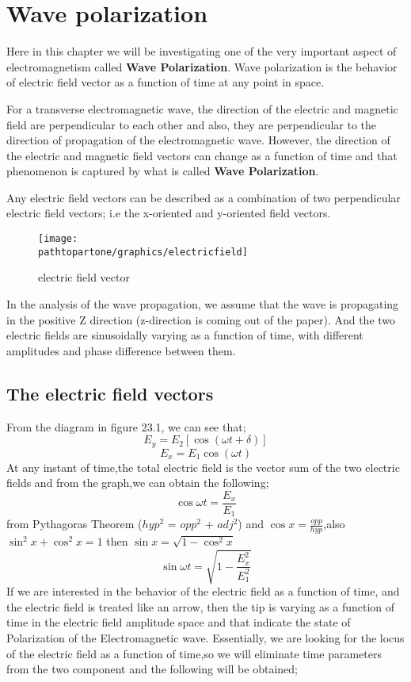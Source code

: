 \chapter{Wave polarization}\label{lec:lec23}
Here in this chapter we will be investigating one of the very important aspect of electromagnetism called \textbf{Wave Polarization}. Wave polarization is the behavior of electric field vector as a function of time at any point in space.

For a transverse electromagnetic wave, the direction of the electric and magnetic field are perpendicular to each other and also, they are perpendicular to the direction of propagation of the electromagnetic wave. However, the direction of the electric and magnetic field vectors can change as a function of time and that phenomenon is captured by what is called \textbf{Wave Polarization}.

Any electric field vectors can be described as a combination of two perpendicular electric field vectors; i.e the x-oriented and y-oriented field vectors. 
\begin{figure}[h]
\centering
\texttt{[image: \\pathtopartone/graphics/electricfield]}
\caption{electric field vector}
\end{figure}

In the analysis of the wave propagation, we assume that the wave is propagating in the positive Z direction (z-direction is coming out of the paper). And the two electric fields are sinusoidally varying as a function of time, with different amplitudes and phase difference between them.	

\section{The electric field vectors} 
From the diagram in figure 23.1, we can see that;
\begin{equation}
E_y = E_2 [\cos(\omega t + \delta)]
\end{equation}
\begin{equation}
E_x = E_1 \cos(\omega t)
\end{equation}
At any instant of time,the total electric field is the vector sum of the two electric  fields and from the graph,we can obtain the following;
\begin{equation}
\cos {\omega t} = \frac {E_x}{E_1} 
\end{equation}
from Pythagoras Theorem ($hyp^2$ = $opp^2$ + $adj^2$) and $ \cos x = \frac{opp}{hyp}$,also $\sin^2 x + \cos^2 x = 1$ then $\sin x = \sqrt{1-\cos^ 2x}$
\begin{equation}
\sin {\omega t} = \sqrt{1 - \frac{E_{x}^2}{E_{1}^2}}
\end{equation}
If we are interested in the behavior of the electric field as a function of time, and the electric field is treated like an arrow, then the tip is varying as a function of time in the electric field amplitude space and that indicate the state of Polarization of the Electromagnetic wave. Essentially, we are looking for the locus of the electric field as a function of time,so we will eliminate time parameters from the two component and the following will be obtained;

